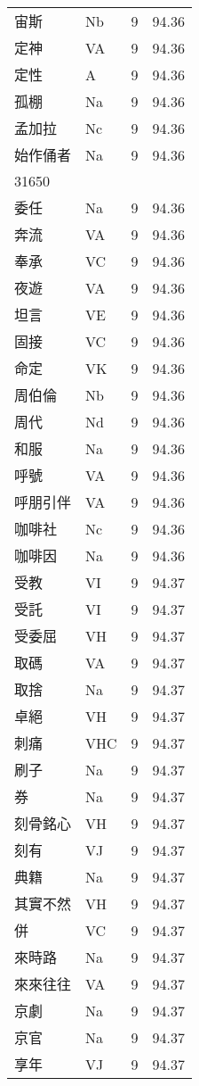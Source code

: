\documentclass[twocolumn]{book}
\begin{document}
\begin{supertabular}{llrr}
宙斯 & Nb & 9 &  94.36\\
定神 & VA & 9 &  94.36\\
定性 & A & 9 &  94.36\\
孤棚 & Na & 9 &  94.36\\
孟加拉 & Nc & 9 &  94.36\\
始作俑者 & Na & 9 &  94.36\\
31650\\
委任 & Na & 9 &  94.36\\
奔流 & VA & 9 &  94.36\\
奉承 & VC & 9 &  94.36\\
夜遊 & VA & 9 &  94.36\\
坦言 & VE & 9 &  94.36\\
固接 & VC & 9 &  94.36\\
命定 & VK & 9 &  94.36\\
周伯倫 & Nb & 9 &  94.36\\
周代 & Nd & 9 &  94.36\\
和服 & Na & 9 &  94.36\\
呼號 & VA & 9 &  94.36\\
呼朋引伴 & VA & 9 &  94.36\\
咖啡社 & Nc & 9 &  94.36\\
咖啡因 & Na & 9 &  94.36\\
受教 & VI & 9 &  94.37\\
受託 & VI & 9 &  94.37\\
受委屈 & VH & 9 &  94.37\\
取碼 & VA & 9 &  94.37\\
取捨 & Na & 9 &  94.37\\
卓絕 & VH & 9 &  94.37\\
刺痛 & VHC & 9 &  94.37\\
刷子 & Na & 9 &  94.37\\
券 & Na & 9 &  94.37\\
刻骨銘心 & VH & 9 &  94.37\\
刻有 & VJ & 9 &  94.37\\
典籍 & Na & 9 &  94.37\\
其實不然 & VH & 9 &  94.37\\
併 & VC & 9 &  94.37\\
來時路 & Na & 9 &  94.37\\
來來往往 & VA & 9 &  94.37\\
京劇 & Na & 9 &  94.37\\
京官 & Na & 9 &  94.37\\
享年 & VJ & 9 &  94.37\\

\end{supertabular}
\end{document}
